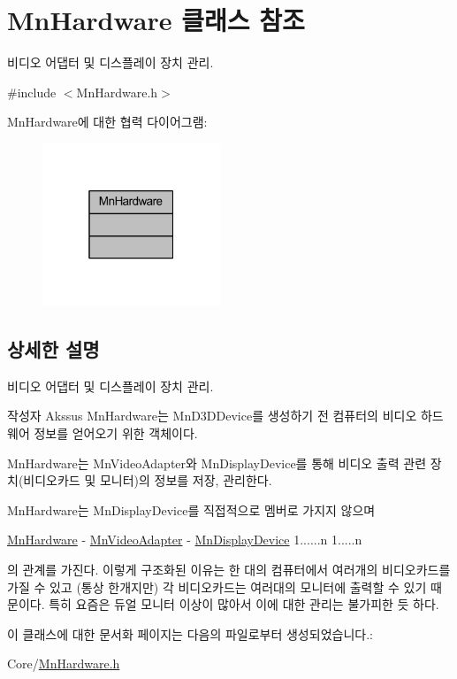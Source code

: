 \hypertarget{class_mn_hardware}{}\section{Mn\+Hardware 클래스 참조}
\label{class_mn_hardware}


비디오 어댑터 및 디스플레이 장치 관리.  




{\ttfamily \#include $<$Mn\+Hardware.\+h$>$}



Mn\+Hardware에 대한 협력 다이어그램\+:
\nopagebreak
\begin{figure}[H]
\begin{center}
\leavevmode
\includegraphics[width=151pt]{class_mn_hardware__coll__graph}
\end{center}
\end{figure}


\subsection{상세한 설명}
비디오 어댑터 및 디스플레이 장치 관리. 

\begin{DoxyAuthor}{작성자}
Akssus Mn\+Hardware는 Mn\+D3\+D\+Device를 생성하기 전 컴퓨터의 비디오 하드웨어 정보를 얻어오기 위한 객체이다.
\end{DoxyAuthor}
Mn\+Hardware는 Mn\+Video\+Adapter와 Mn\+Display\+Device를 통해 비디오 출력 관련 장치(비디오카드 및 모니터)의 정보를 저장, 관리한다.

Mn\+Hardware는 Mn\+Display\+Device를 직접적으로 멤버로 가지지 않으며

\hyperlink{class_mn_hardware}{Mn\+Hardware} -\/ \hyperlink{class_mn_video_adapter}{Mn\+Video\+Adapter} -\/ \hyperlink{class_mn_display_device}{Mn\+Display\+Device} 1......n 1.....n

의 관계를 가진다. 이렇게 구조화된 이유는 한 대의 컴퓨터에서 여러개의 비디오카드를 가질 수 있고 (통상 한개지만) 각 비디오카드는 여러대의 모니터에 출력할 수 있기 때문이다. 특히 요즘은 듀얼 모니터 이상이 많아서 이에 대한 관리는 불가피한 듯 하다. 

이 클래스에 대한 문서화 페이지는 다음의 파일로부터 생성되었습니다.\+:\begin{DoxyCompactItemize}
\item 
Core/\hyperlink{_mn_hardware_8h}{Mn\+Hardware.\+h}\end{DoxyCompactItemize}
